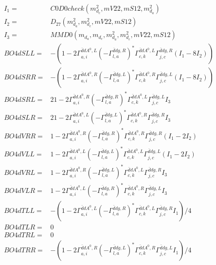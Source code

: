 \documentclass[A4,landscape]{article}
\begin{document}
\begin{align} 
I_1 = & C0D0check(m^2_{d_{{c}}}, mV22, mS12, m^2_{d_{{a}}}) \\ 
I_2 = & D_{27}(m^2_{d_{{a}}}, m^2_{d_{{c}}}, mV22, mS12) \\ 
I_3 = & MMD0(m_{d_{{a}}}, m_{d_{{c}}}, m^2_{d_{{a}}}, m^2_{d_{{c}}}, mV22, mS12) \\ 
  BO4dSLL= & -(1
-
2 \Gamma^{\bar{d}d A^0 ,L}_{a, i} (- \Gamma^{\bar{d}d g ,R} _{l, a})^* \Gamma^{\bar{d}d A^0 ,L}_{c, k} \Gamma^{\bar{d}d g ,R}_{j, c} (I_1 - 8 I_2)) \\ 
  BO4dSRR= & -(1
-
2 \Gamma^{\bar{d}d A^0 ,R}_{a, i} (- \Gamma^{\bar{d}d g ,L} _{l, a})^* \Gamma^{\bar{d}d A^0 ,R}_{c, k} \Gamma^{\bar{d}d g ,L}_{j, c} (I_1 - 8 I_2)) \\ 
  BO4dSRL= & 2 1
-
2 \Gamma^{\bar{d}d A^0 ,R}_{a, i} (- \Gamma^{\bar{d}d g ,R} _{l, a})^* \Gamma^{\bar{d}d A^0 ,L}_{c, k} \Gamma^{\bar{d}d g ,L}_{j, c} I_3 \\ 
  BO4dSLR= & 2 1
-
2 \Gamma^{\bar{d}d A^0 ,L}_{a, i} (- \Gamma^{\bar{d}d g ,L} _{l, a})^* \Gamma^{\bar{d}d A^0 ,R}_{c, k} \Gamma^{\bar{d}d g ,R}_{j, c} I_3 \\ 
  BO4dVRR= & 1
-
2 \Gamma^{\bar{d}d A^0 ,R}_{a, i} (- \Gamma^{\bar{d}d g ,R} _{l, a})^* \Gamma^{\bar{d}d A^0 ,R}_{c, k} \Gamma^{\bar{d}d g ,R}_{j, c} (I_1 - 2 I_2) \\ 
  BO4dVLL= & 1
-
2 \Gamma^{\bar{d}d A^0 ,L}_{a, i} (- \Gamma^{\bar{d}d g ,L} _{l, a})^* \Gamma^{\bar{d}d A^0 ,L}_{c, k} \Gamma^{\bar{d}d g ,L}_{j, c} (I_1 - 2 I_2) \\ 
  BO4dVRL= & 1
-
2 \Gamma^{\bar{d}d A^0 ,R}_{a, i} (- \Gamma^{\bar{d}d g ,L} _{l, a})^* \Gamma^{\bar{d}d A^0 ,L}_{c, k} \Gamma^{\bar{d}d g ,R}_{j, c} I_3 \\ 
  BO4dVLR= & 1
-
2 \Gamma^{\bar{d}d A^0 ,L}_{a, i} (- \Gamma^{\bar{d}d g ,R} _{l, a})^* \Gamma^{\bar{d}d A^0 ,R}_{c, k} \Gamma^{\bar{d}d g ,L}_{j, c} I_3 \\ 
  BO4dTLL= & -(1
-
2 \Gamma^{\bar{d}d A^0 ,L}_{a, i} (- \Gamma^{\bar{d}d g ,R} _{l, a})^* \Gamma^{\bar{d}d A^0 ,L}_{c, k} \Gamma^{\bar{d}d g ,R}_{j, c} I_1)/4 \\ 
  BO4dTLR= & 0 \\ 
  BO4dTRL= & 0 \\ 
  BO4dTRR= & -(1
-
2 \Gamma^{\bar{d}d A^0 ,R}_{a, i} (- \Gamma^{\bar{d}d g ,L} _{l, a})^* \Gamma^{\bar{d}d A^0 ,R}_{c, k} \Gamma^{\bar{d}d g ,L}_{j, c} I_1)/4 \\ 
\end{align} 
\end{document}
